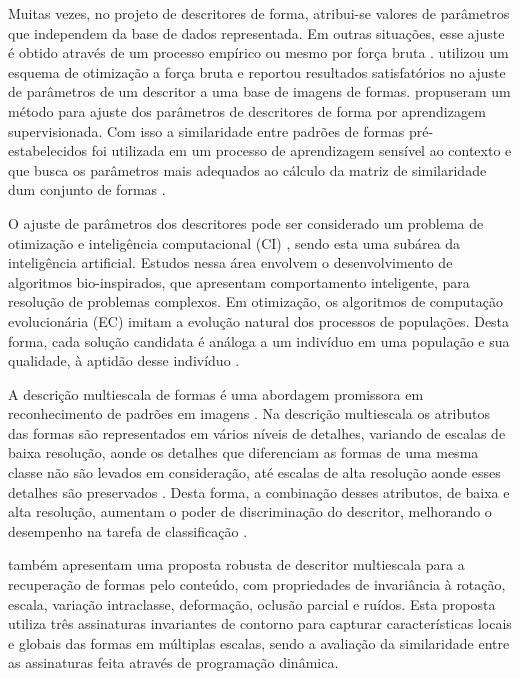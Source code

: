 Muitas vezes, no projeto de descritores de forma, atribui-se valores de parâmetros que independem da base de dados representada. Em outras situações, esse ajuste é obtido através de um processo empírico ou mesmo por força bruta \cite{mokhtarian1998robust, Ling:2007:SCU:1191552.1191806, Wang2012134}.  utilizou um esquema de otimização a força bruta e reportou resultados satisfatórios no ajuste de parâmetros de um descritor a uma base de imagens de formas.   propuseram um método para ajuste dos parâmetros de descritores de forma por aprendizagem supervisionada. Com isso a similaridade entre padrões de formas pré-estabelecidos foi utilizada em um processo de aprendizagem sensível ao contexto e que busca os parâmetros mais adequados ao cálculo da matriz de similaridade dum conjunto de formas \cite{4815272}.

O ajuste de parâmetros dos descritores pode ser considerado um problema de otimização e inteligência computacional (CI) \cite{Andries:2007}, sendo esta uma subárea da inteligência artificial. Estudos nessa área envolvem o desenvolvimento de algoritmos bio-inspirados, que apresentam comportamento inteligente, para resolução de problemas complexos. Em otimização, os algoritmos de computação evolucionária (EC) imitam a evolução natural dos processos de populações. Desta forma, cada solução candidata é análoga a um indivíduo em uma população e sua qualidade, à aptidão desse indivíduo \cite{Eiben:2015}.

A descrição multiescala de formas \cite{LiKuangLiuEtAl2016,ShuPanWu2015, HuangHanHe2014, Costa:2009} é uma abordagem promissora em reconhecimento de padrões em imagens \cite{Direkoglu:2011}. Na descrição multiescala os atributos das formas são representados em vários níveis de detalhes, variando de escalas de baixa resolução, aonde os detalhes que diferenciam as formas de uma mesma classe não são levados em consideração, até escalas de alta resolução aonde esses detalhes são preservados \cite{Ullman:1996}. Desta forma, a combinação desses atributos, de baixa e alta resolução, aumentam o poder de discriminação do descritor, melhorando o desempenho na tarefa de classificação \cite{Direkoglu:2011}.

 também apresentam uma proposta robusta de descritor multiescala para a recuperação de formas pelo conteúdo, com propriedades de invariância à rotação, escala, variação intraclasse, deformação,  oclusão parcial e ruídos. Esta proposta utiliza três assinaturas invariantes de contorno para capturar características locais e globais das formas em múltiplas escalas, sendo a avaliação da similaridade entre as assinaturas feita através de programação dinâmica.


